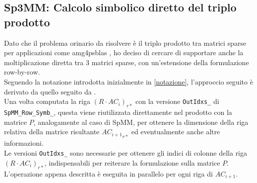 \subsection{Sp3MM: Calcolo simbolico diretto del triplo prodotto} \label{chSpMMSymb:Sp3MMSymb}
Dato che il problema orinario da risolvere è il triplo prodotto tra matrici sparse per applicazioni come 
amg4psblas \cite{AMG4PSBLAS}, ho deciso di cercare di supportare anche la moltiplicazione diretta 
tra 3 matrici sparse, con un'estensione della formulazione row-by-row.\\
Seguendo la notazione introdotta inizialmente in \ref{notazione}, l'approccio seguito è derivato da quello seguito da \cite{Sp3MM4AMG}.\\
Una volta computata la riga $\left(R\cdot AC_i\right)_{r*}$ con la versione \verb|OutIdxs_| di \verb|SpMM_Row_Symb_|, 
questa viene riutilizzata direttamente nel prodotto con la matrice $P$, analogamente al caso di SpMM,
per ottenere la dimensione della riga relativa della matrice risultante ${AC_{i+1}}_{r*}$ ed eventualmente anche altre informazioni.\\ 
Le versioni \verb|OutIdxs_| sono necessarie per ottenere  gli indici di colonne della riga $\left(R\cdot AC_i\right)_{r*}$,
indispensabili per reiterare la formulazione \rowbyrow sulla matrice $P$.\\
L'operazione appena descritta è eseguita in parallelo per ogni riga di $AC_{i+1}$.\\

